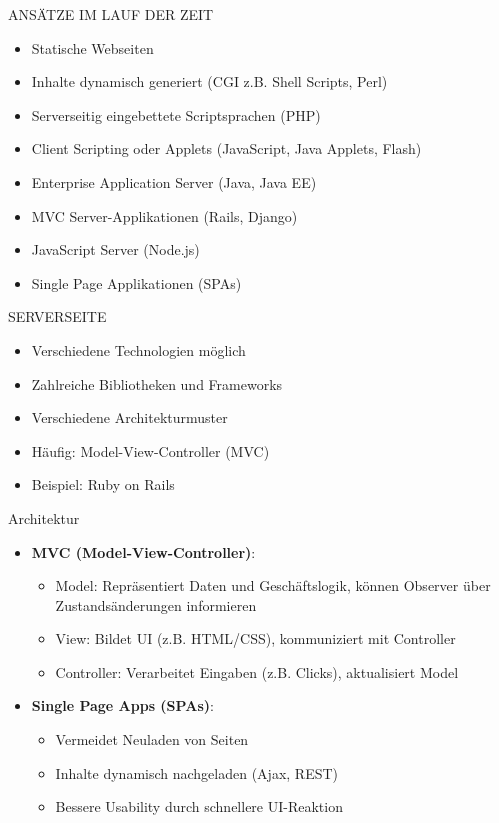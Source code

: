 \begin{definition}{ANSÄTZE IM LAUF DER ZEIT}
\begin{itemize}
  \item Statische Webseiten
  \item Inhalte dynamisch generiert (CGI z.B. Shell Scripts, Perl)
  \item Serverseitig eingebettete Scriptsprachen (PHP)
  \item Client Scripting oder Applets (JavaScript, Java Applets, Flash)
  \item Enterprise Application Server (Java, Java EE)
  \item MVC Server-Applikationen (Rails, Django)
  \item JavaScript Server (Node.js)
  \item Single Page Applikationen (SPAs)
\end{itemize}
\end{definition}

\begin{definition}{SERVERSEITE}
\begin{itemize}
  \item Verschiedene Technologien möglich
  \item Zahlreiche Bibliotheken und Frameworks
  \item Verschiedene Architekturmuster
  \item Häufig: Model-View-Controller (MVC)
  \item Beispiel: Ruby on Rails
\end{itemize}
\end{definition}

\begin{concept}{Architektur}
\begin{itemize}
    \item \textbf{MVC (Model-View-Controller)}:
        \begin{itemize}
            \item Model: Repräsentiert Daten und Geschäftslogik, können Observer über Zustandsänderungen informieren
            \item View: Bildet UI (z.B. HTML/CSS), kommuniziert mit Controller
            \item Controller: Verarbeitet Eingaben (z.B. Clicks), aktualisiert Model
        \end{itemize}
    \item \textbf{Single Page Apps (SPAs)}:
        \begin{itemize}
            \item Vermeidet Neuladen von Seiten
            \item Inhalte dynamisch nachgeladen (Ajax, REST)
            \item Bessere Usability durch schnellere UI-Reaktion
        \end{itemize}
\end{itemize}
\end{concept}

